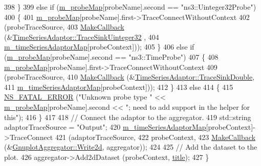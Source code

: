\begin{DoxyCode}
398     \}
399   \textcolor{keywordflow}{else} \textcolor{keywordflow}{if} (\hyperlink{classns3_1_1GnuplotHelper_aa4e50b82ac09e3ec99c1881f37f12ca5}{m\_probeMap}[probeName].second == \textcolor{stringliteral}{"ns3::Uinteger32Probe"})
400     \{
401       \hyperlink{classns3_1_1GnuplotHelper_aa4e50b82ac09e3ec99c1881f37f12ca5}{m\_probeMap}[probeName].first->TraceConnectWithoutContext
402         (probeTraceSource,
403         \hyperlink{group__makecallbackmemptr_ga9376283685aa99d204048d6a4b7610a4}{MakeCallback} (&\hyperlink{classns3_1_1TimeSeriesAdaptor_add04eee090a86dc859b2415710c85b30}{TimeSeriesAdaptor::TraceSinkUinteger32}
      ,
404                       \hyperlink{classns3_1_1GnuplotHelper_ad013691ac007d20ac6c04261dda2432a}{m\_timeSeriesAdaptorMap}[probeContext]));
405     \}
406   \textcolor{keywordflow}{else} \textcolor{keywordflow}{if} (\hyperlink{classns3_1_1GnuplotHelper_aa4e50b82ac09e3ec99c1881f37f12ca5}{m\_probeMap}[probeName].second == \textcolor{stringliteral}{"ns3::TimeProbe"})
407     \{
408       \hyperlink{classns3_1_1GnuplotHelper_aa4e50b82ac09e3ec99c1881f37f12ca5}{m\_probeMap}[probeName].first->TraceConnectWithoutContext
409         (probeTraceSource,
410         \hyperlink{group__makecallbackmemptr_ga9376283685aa99d204048d6a4b7610a4}{MakeCallback} (&\hyperlink{classns3_1_1TimeSeriesAdaptor_a7b5499ffc99cfe741948166ede81980a}{TimeSeriesAdaptor::TraceSinkDouble},
411                       \hyperlink{classns3_1_1GnuplotHelper_ad013691ac007d20ac6c04261dda2432a}{m\_timeSeriesAdaptorMap}[probeContext]));
412     \}
413   \textcolor{keywordflow}{else}
414     \{
415       \hyperlink{group__fatal_ga5131d5e3f75d7d4cbfd706ac456fdc85}{NS\_FATAL\_ERROR} (\textcolor{stringliteral}{"Unknown probe type "} << \hyperlink{classns3_1_1GnuplotHelper_aa4e50b82ac09e3ec99c1881f37f12ca5}{m\_probeMap}[probeName].second << \textcolor{stringliteral}{";
       need to add support in the helper for this"});
416     \}
417 
418   \textcolor{comment}{// Connect the adaptor to the aggregator.}
419   std::string adaptorTraceSource = \textcolor{stringliteral}{"Output"};
420   \hyperlink{classns3_1_1GnuplotHelper_ad013691ac007d20ac6c04261dda2432a}{m\_timeSeriesAdaptorMap}[probeContext]->TraceConnect
421     (adaptorTraceSource,
422     probeContext,
423     \hyperlink{group__makecallbackmemptr_ga9376283685aa99d204048d6a4b7610a4}{MakeCallback} (&\hyperlink{classns3_1_1GnuplotAggregator_a18d1be357d703299d71519f08c4fda07}{GnuplotAggregator::Write2d}, aggregator));
424 
425   \textcolor{comment}{// Add the dataset to the plot.}
426   aggregator->Add2dDataset (probeContext, \hyperlink{lte__link__budget_8m_a5b09b57ee35b13a452f0c089c0709f8b}{title});
427 \}
\end{DoxyCode}


